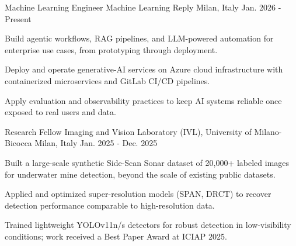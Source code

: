 
\begin{cventries}

  \cventry
    {Machine Learning Engineer} %
    {Machine Learning Reply} %
    {Milan, Italy} %
    {Jan. 2026 - Present} %
    {
      \begin{cvitems}
        \item {Build agentic workflows, RAG pipelines, and LLM-powered automation for enterprise use cases, from prototyping through deployment.}
        \item {Deploy and operate generative-AI services on Azure cloud infrastructure with containerized microservices and GitLab CI/CD pipelines.}
        \item {Apply evaluation and observability practices to keep AI systems reliable once exposed to real users and data.}
      \end{cvitems}
    }

  \cventry
    {Research Fellow} %
    {Imaging and Vision Laboratory (IVL), University of Milano-Bicocca} %
    {Milan, Italy} %
    {Jan. 2025 - Dec. 2025} %
    {
      \begin{cvitems}
        \item {Built a large-scale synthetic Side-Scan Sonar dataset of 20,000+ labeled images for underwater mine detection, beyond the scale of existing public datasets.}
        \item {Applied and optimized super-resolution models (SPAN, DRCT) to recover detection performance comparable to high-resolution data.}
        \item {Trained lightweight YOLOv11n/s detectors for robust detection in low-visibility conditions; work received a Best Paper Award at ICIAP 2025.}
      \end{cvitems}
    }

\end{cventries}
